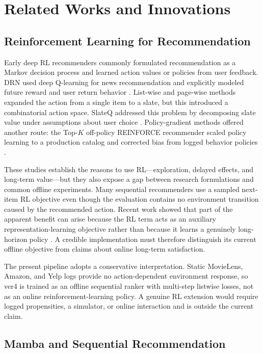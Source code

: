 \documentclass[11pt,a4paper]{article}
\begin{document}
\section{Related Works and Innovations}

\subsection{Reinforcement Learning for Recommendation}

Early deep RL recommenders commonly formulated recommendation as a Markov decision process and learned action values or policies from user feedback. DRN used deep Q-learning for news recommendation and explicitly modeled future reward and user return behavior \cite{DRN}. List-wise and page-wise methods expanded the action from a single item to a slate, but this introduced a combinatorial action space. SlateQ addressed this problem by decomposing slate value under assumptions about user choice \cite{SLATEQ}. Policy-gradient methods offered another route: the Top-$K$ off-policy REINFORCE recommender scaled policy learning to a production catalog and corrected bias from logged behavior policies \cite{TOPKREINFORCE}.

These studies establish the reasons to use RL---exploration, delayed effects, and long-term value---but they also expose a gap between research formulations and common offline experiments. Many sequential recommenders use a sampled next-item RL objective even though the evaluation contains no environment transition caused by the recommended action. Recent work showed that part of the apparent benefit can arise because the RL term acts as an auxiliary representation-learning objective rather than because it learns a genuinely long-horizon policy \cite{UNEXPECTEDRL}. A credible implementation must therefore distinguish its current offline objective from claims about online long-term satisfaction.

The present pipeline adopts a conservative interpretation. Static MovieLens,
Amazon, and Yelp logs provide no action-dependent environment response, so
ver4 is trained as an offline sequential ranker with multi-step listwise losses,
not as an online reinforcement-learning policy. A genuine RL extension would
require logged propensities, a simulator, or online interaction and is outside
the current claim.

\subsection{Mamba and Sequential Recommendation}
\end{document}
